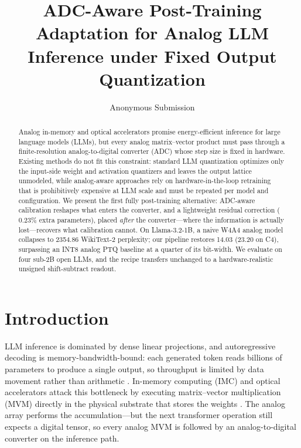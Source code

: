 \documentclass[letterpaper]{article} %
\title{ADC-Aware Post-Training Adaptation for Analog LLM Inference under Fixed Output Quantization}
\author{Anonymous Submission}
\theoremstyle{plain}
\begin{document}
\maketitle

\begin{abstract}
Analog in-memory and optical accelerators promise energy-efficient inference for large language models (LLMs), but every analog matrix--vector product must pass through a finite-resolution analog-to-digital converter (ADC) whose step size is fixed in hardware. Existing methods do not fit this constraint: standard LLM quantization optimizes only the input-side weight and activation quantizers and leaves the output lattice unmodeled, while analog-aware approaches rely on hardware-in-the-loop retraining that is prohibitively expensive at LLM scale and must be repeated per model and configuration. We present the first fully post-training alternative: ADC-aware calibration reshapes what enters the converter, and a lightweight residual correction ($0.23\%$ extra parameters), placed \emph{after} the converter---where the information is actually lost---recovers what calibration cannot. On Llama-3.2-1B, a naive W4A4 analog model collapses to 2354.86 WikiText-2 perplexity; our pipeline restores 14.03 (23.20 on C4), surpassing an INT8 analog PTQ baseline at a quarter of its bit-width. We evaluate on four sub-2B open LLMs, and the recipe transfers unchanged to a hardware-realistic unsigned shift-subtract readout.
\end{abstract}

\section{Introduction}

LLM inference is dominated by dense linear projections, and autoregressive decoding is memory-bandwidth-bound: each generated token reads billions of parameters to produce a single output, so throughput is limited by data movement rather than arithmetic \citep{pope2023efficiently}. In-memory computing (IMC) and optical accelerators attack this bottleneck by executing matrix--vector multiplication (MVM) directly in the physical substrate that stores the weights \citep{xiao2021accuracy,legallo2023mixed,spall2022hybrid}. The analog array performs the accumulation---but the next transformer operation still expects a digital tensor, so every analog MVM is followed by an analog-to-digital converter on the inference path.
\end{document}
